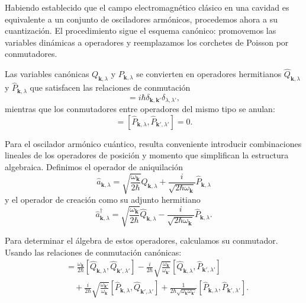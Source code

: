         Habiendo establecido que el campo electromagnético clásico en una cavidad es equivalente a un conjunto de osciladores armónicos, procedemos ahora a su cuantización. El procedimiento sigue el esquema canónico: promovemos las variables dinámicas a operadores y reemplazamos los corchetes de Poisson por conmutadores.

        Las variables canónicas $Q_{\mathbf{k},\lambda}$ y $P_{\mathbf{k},\lambda}$ se convierten en operadores hermitianos $\hat{Q}_{\mathbf{k},\lambda}$ y $\hat{P}_{\mathbf{k},\lambda}$ que satisfacen las relaciones de conmutación
        \begin{equation}
            [\hat{Q}_{\mathbf{k},\lambda}, \hat{P}_{\mathbf{k}',\lambda'}] = i\hbar \delta_{\mathbf{k},\mathbf{k}'}\delta_{\lambda,\lambda'},
        \end{equation}
        mientras que los conmutadores entre operadores del mismo tipo se anulan:
        \begin{equation}
            [\hat{Q}_{\mathbf{k},\lambda}, \hat{Q}_{\mathbf{k}',\lambda'}] = [\hat{P}_{\mathbf{k},\lambda}, \hat{P}_{\mathbf{k}',\lambda'}] = 0.
        \end{equation}

        Para el oscilador armónico cuántico, resulta conveniente introducir combinaciones lineales de los operadores de posición y momento que simplifican la estructura algebraica. Definimos el operador de aniquilación
        \begin{equation}
            \hat{a}_{\mathbf{k},\lambda} = \sqrt{\frac{\omega_{\mathbf{k}}}{2\hbar}}\hat{Q}_{\mathbf{k},\lambda} + \frac{i}{\sqrt{2\hbar\omega_{\mathbf{k}}}}\hat{P}_{\mathbf{k},\lambda}
        \end{equation}
        y el operador de creación como su adjunto hermitiano
        \begin{equation}
            \hat{a}^\dagger_{\mathbf{k},\lambda} = \sqrt{\frac{\omega_{\mathbf{k}}}{2\hbar}}\hat{Q}_{\mathbf{k},\lambda} - \frac{i}{\sqrt{2\hbar\omega_{\mathbf{k}}}}\hat{P}_{\mathbf{k},\lambda}.
        \end{equation}
        
        Para determinar el álgebra de estos operadores, calculamos su conmutador. Usando las relaciones de conmutación canónicas:
        \begin{align}
            [\hat{a}_{\mathbf{k},\lambda}, \hat{a}^\dagger_{\mathbf{k}',\lambda'}] &= \frac{\omega_{\mathbf{k}}}{2\hbar}[\hat{Q}_{\mathbf{k},\lambda}, \hat{Q}_{\mathbf{k}',\lambda'}] - \frac{i}{2\hbar}\sqrt{\frac{\omega_{\mathbf{k}}}{\omega_{\mathbf{k}'}}}[\hat{Q}_{\mathbf{k},\lambda}, \hat{P}_{\mathbf{k}',\lambda'}] \nonumber \\
            &\quad + \frac{i}{2\hbar}\sqrt{\frac{\omega_{\mathbf{k}'}}{\omega_{\mathbf{k}}}}[\hat{P}_{\mathbf{k},\lambda}, \hat{Q}_{\mathbf{k}',\lambda'}] + \frac{1}{2\hbar\sqrt{\omega_{\mathbf{k}}\omega_{\mathbf{k}'}}}[\hat{P}_{\mathbf{k},\lambda}, \hat{P}_{\mathbf{k}',\lambda'}].
        \end{align}
        

